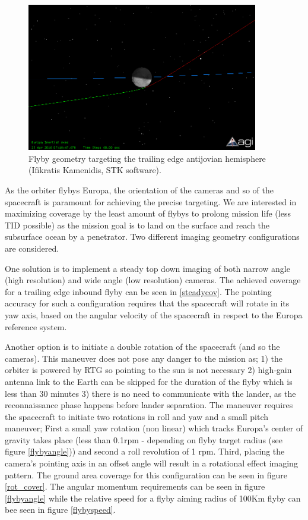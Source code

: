 \begin{figure}[htb!]
\centering
\includegraphics[width=0.9\textwidth]{figures/Orbiter/flyby2.png}
\caption{Flyby geometry targeting the trailing edge antijovian hemisphere (Ifikratis Kamenidis, STK software).}
\label{flyby2}
\end{figure}
As the orbiter flybys Europa, the orientation of the cameras and so of the spacecraft is paramount for achieving the precise targeting. We are interested in maximizing coverage by the least amount of flybys to prolong mission life (less TID possible) as the mission goal is to land on the surface and reach the subsurface ocean by a penetrator. 
Two different imaging geometry configurations are considered. 

One solution is to implement a steady top down imaging of both narrow angle (high resolution) and wide angle (low resolution) cameras. The achieved coverage for a trailing edge inbound flyby can be seen in \ref{steadycov}. The pointing accuracy for such a configuration requires that the spacecraft will rotate in its yaw axis, based on the angular velocity of the spacecraft in respect to the Europa reference system. 

Another option is to initiate a double rotation of the spacecraft (and so the cameras). This maneuver does not pose any danger to the mission as; 1) the orbiter is powered by RTG so pointing to the sun is not necessary 2) high-gain antenna link to the Earth can be skipped for the duration of the flyby which is less than 30 minutes 3) there is no need to communicate with the lander, as the reconnaissance phase happens before lander separation. The maneuver requires the spacecraft to initiate two rotations in roll and yaw and a small pitch maneuver; First a small yaw rotation (non linear) which tracks Europa's center of gravity takes place (less than 0.1rpm - depending on flyby target radius (see figure \ref{flybyangle})) and second a roll revolution of 1 rpm. Third, placing the camera's pointing axis in an offset angle will result in a rotational effect imaging pattern. The ground area coverage for this configuration can be seen in figure \ref{rot_cover}. The angular momentum requirements can be seen in figure \ref{flybyangle} while the relative speed for a flyby aiming radius of 100Km flyby can bee seen in figure \ref{flybyspeed}.

